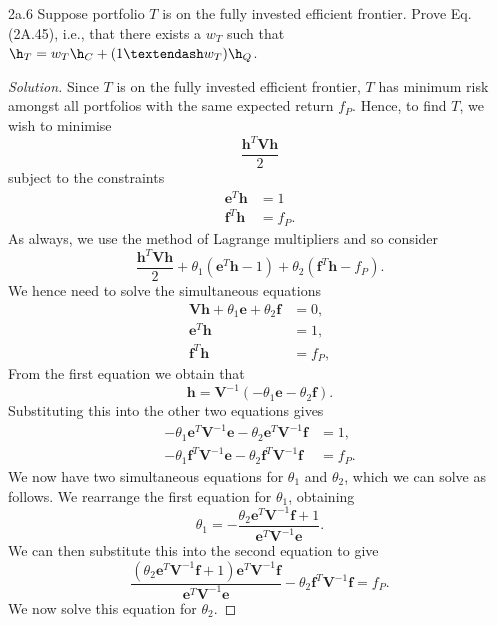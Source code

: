 \begin{problem}{2a.6}
Suppose portfolio $T$ is on the fully invested efficient frontier. Prove Eq. (2A.45), i.e., that there
exists a $w_{T}$ such that $\h_T = w_T \h_C + (1 – w_T )\h_Q$.
\end{problem}

\begin{proof}[Solution]
Since $T$ is on the fully invested efficient frontier, $T$ has minimum risk amongst all portfolios with the same expected return $f_{P}$. Hence, to find $T$, we wish to minimise \[\frac{\mathbf{h}^{T}\mathbf{V}\mathbf{h}}{2}\] subject to the constraints
\begin{align*}
\mathbf{e}^{T}\mathbf{h} &= 1\\
\mathbf{f}^{T}\mathbf{h} &= f_{P}.
\end{align*}
As always, we use the method of Lagrange multipliers and so consider \[\frac{\mathbf{h}^{T}\mathbf{V}\mathbf{h}}{2} + \theta_{1}(\mathbf{e}^{T}\mathbf{h} - 1) + \theta_{2}(\mathbf{f}^{T}\mathbf{h} - f_{P}).\] We hence need to solve the simultaneous equations
\begin{align*}
\mathbf{V}\mathbf{h} + \theta_{1}\mathbf{e} + \theta_{2}\mathbf{f} &= 0, \\
\mathbf{e}^{T}\mathbf{h} &= 1, \\
\mathbf{f}^{T}\mathbf{h} &= f_{P},
\end{align*}
From the first equation we obtain that 
\begin{equation}\label{eq:6h}
\mathbf{h} = \mathbf{V}^{-1}(-\theta_{1}\mathbf{e} - \theta_{2}\mathbf{f}).
\end{equation}
Substituting this into the other two equations gives
\begin{align*}
-\theta_{1}\mathbf{e}^{T}\mathbf{V}^{-1}\mathbf{e} - \theta_{2}\mathbf{e}^{T}\mathbf{V}^{-1}\mathbf{f} &= 1,\\
-\theta_{1}\mathbf{f}^{T}\mathbf{V}^{-1}\mathbf{e} - \theta_{2}\mathbf{f}^{T}\mathbf{V}^{-1}\mathbf{f} &= f_{P}.
\end{align*}
We now have two simultaneous equations for $\theta_{1}$ and $\theta_{2}$, which we can solve as follows. We rearrange the first equation for $\theta_{1}$, obtaining
\[\theta_{1} = - \frac{\theta_{2}\mathbf{e}^{T}\mathbf{V}^{-1}\mathbf{f} + 1}{\mathbf{e}^{T}\mathbf{V}^{-1}\mathbf{e}}.\] We can then substitute this into the second equation to give \[\frac{(\theta_{2}\mathbf{e}^{T}\mathbf{V}^{-1}\mathbf{f} + 1)\mathbf{e}^{T}\mathbf{V}^{-1}\mathbf{f}}{\mathbf{e}^{T}\mathbf{V}^{-1}\mathbf{e}} - \theta_{2}\mathbf{f}^{T}\mathbf{V}^{-1}\mathbf{f} = f_{P}.\] We now solve this equation for $\theta_{2}$.

\end{proof}

